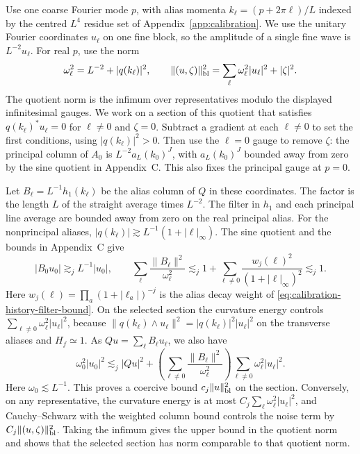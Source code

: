 \documentclass[11pt,reqno]{amsart}
\numberwithin{equation}{section}
\theoremstyle{definition}
\theoremstyle{remark}
\begin{document}
Use one coarse Fourier mode \(p\), with alias momenta
\(k_\ell=(p+2\pi\ell)/L\) indexed by the centred \(L^4\) residue
set of Appendix~\ref{app:calibration}. We use the unitary Fourier
coordinates \(u_\ell\) on one fine block, so the amplitude of a
single fine wave is \(L^{-2}u_\ell\). For real \(p\), use the norm
\[
 \omega_\ell^2=L^{-2}+|q(k_\ell)|^2,\qquad
 \|(u,\zeta)\|_{\rm bl}^2=\sum_\ell\omega_\ell^2|u_\ell|^2+|\zeta|^2.
\]
The quotient norm is the infimum over representatives modulo
the displayed infinitesimal gauges. We work on a section of this
quotient that satisfies \(q(k_\ell)^*u_\ell=0\) for \(\ell\ne0\)
and \(\zeta=0\). Subtract a gradient at each \(\ell\ne0\) to set
the first conditions, using \(|q(k_\ell)|^2>0\). Then use the
\(\ell=0\) gauge to remove \(\zeta\): the principal column of
\(A_0\) is \(L^{-2}a_L(k_0)^J\), with \(a_L(k_0)^J\) bounded
away from zero by the sine quotient in Appendix~C. This also
fixes the principal gauge at \(p=0\).

Let \(B_\ell=L^{-1}h_1(k_\ell)\) be the alias column of \(Q\)
in these coordinates. The factor is the length \(L\) of the
straight average times \(L^{-2}\). The filter in \(h_1\) and
each principal line average are bounded away from zero on
the real principal alias. For the nonprincipal aliases,
\(|q(k_\ell)|\gtrsim L^{-1}(1+|\ell|_\infty)\). The sine
quotient and the bounds in Appendix~C give
\[
 |B_0u_0|\gtrsim_j L^{-1}|u_0|,\qquad
 \sum_\ell\frac{\|B_\ell\|^2}{\omega_\ell^2}
     \lesssim_j 1+\sum_{\ell\ne0}
          \frac{w_j(\ell)^2}{(1+|\ell|_\infty)^2}\lesssim_j 1.
\]
Here \(w_j(\ell)=\prod_a(1+|\ell_a|)^{-j}\) is the alias
decay weight of \eqref{eq:calibration-history-filter-bound}.
On the selected section the curvature energy controls
\(\sum_{\ell\ne0}\omega_\ell^2|u_\ell|^2\), because
\(\|q(k_\ell)\wedge u_\ell\|^2=|q(k_\ell)|^2|u_\ell|^2\)
on the transverse aliases and \(H_f\simeq 1\).
As \(Qu=\sum_\ell B_\ell u_\ell\), we also have
\[
 \omega_0^2|u_0|^2
 \lesssim_j |Qu|^2+
       \left(\sum_{\ell\ne0}\frac{\|B_\ell\|^2}{\omega_\ell^2}\right)
       \sum_{\ell\ne0}\omega_\ell^2|u_\ell|^2 .
\]
Here \(\omega_0\lesssim L^{-1}\). This proves a coercive bound
\(c_j\|u\|_{\rm bl}^2\) on the section. Conversely, on any
representative, the curvature energy is at most
\(C_j\sum_\ell\omega_\ell^2|u_\ell|^2\), and Cauchy--Schwarz
with the weighted column bound controls the noise term by
\(C_j\|(u,\zeta)\|_{\rm bl}^2\). Taking the infimum gives the
upper bound in the quotient norm and shows that the selected
section has norm comparable to that quotient norm.
\end{document}

